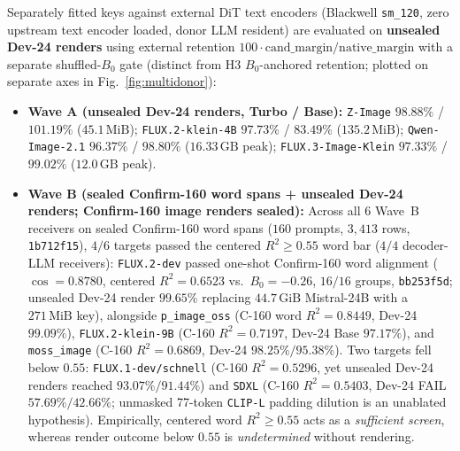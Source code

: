 \documentclass[10pt,twocolumn]{article}
\begin{document}
Separately fitted keys against external DiT text encoders (Blackwell \texttt{sm\_120}, zero upstream text encoder loaded, donor LLM resident) are evaluated on \textbf{unsealed Dev-24 renders} using external retention $100\cdot\text{cand\_margin}/\text{native\_margin}$ with a separate shuffled-$B_0$ gate (distinct from H3 $B_0$-anchored retention; plotted on separate axes in Fig.~\ref{fig:multidonor}):
\begin{itemize}[leftmargin=1.2em,itemsep=1.5pt]
\item \textbf{Wave A (unsealed Dev-24 renders, Turbo / Base):} \texttt{Z-Image} $98.88\%$ / $101.19\%$ ($45.1\,\text{MiB}$); \texttt{FLUX.2-klein-4B} $97.73\%$ / $83.49\%$ ($135.2\,\text{MiB}$); \texttt{Qwen-Image-2.1} $96.37\%$ / $98.80\%$ ($16.33\,\text{GB}$ peak); \texttt{FLUX.3-Image-Klein} $97.33\%$ / $99.02\%$ ($12.0\,\text{GB}$ peak).
\item \textbf{Wave B (sealed Confirm-160 word spans + unsealed Dev-24 renders; Confirm-160 image renders sealed):} Across all $6$ Wave~B receivers on sealed Confirm-160 word spans ($160$ prompts, $3{,}413$ rows, \texttt{1b712f15}), $4/6$ targets passed the centered $R^2\ge 0.55$ word bar ($4/4$ decoder-LLM receivers): \texttt{FLUX.2-dev} passed one-shot Confirm-160 word alignment ($\cos=0.8780$, centered $R^2=0.6523$ vs.\ $B_0=-0.26$, $16/16$ groups, \texttt{bb253f5d}; unsealed Dev-24 render $99.65\%$ replacing $44.7\,\text{GiB}$ Mistral-24B with a $271\,\text{MiB}$ key), alongside \texttt{p\_image\_oss} (C-160 word $R^2=0.8449$, Dev-24 $99.09\%$), \texttt{FLUX.2-klein-9B} (C-160 $R^2=0.7197$, Dev-24 Base $97.17\%$), and \texttt{moss\_image} (C-160 $R^2=0.6869$, Dev-24 $98.25\%/95.38\%$). Two targets fell below $0.55$: \texttt{FLUX.1-dev/schnell} (C-160 $R^2=0.5296$, yet unsealed Dev-24 renders reached $93.07\%/91.44\%$) and \texttt{SDXL} (C-160 $R^2=0.5403$, Dev-24 FAIL $57.69\%/42.66\%$; unmasked 77-token \texttt{CLIP-L} padding dilution is an unablated hypothesis). Empirically, centered word $R^2 \ge 0.55$ acts as a \emph{sufficient screen}, whereas render outcome below $0.55$ is \emph{undetermined} without rendering.
\end{itemize}
\end{document}
